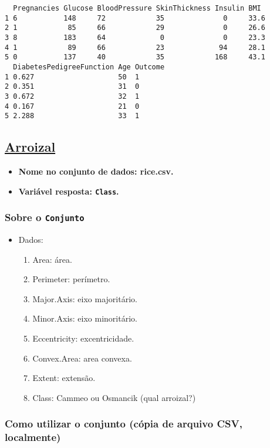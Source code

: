 \documentclass[11pt]{article}
\begin{document}
\begin{verbatim}
  Pregnancies Glucose BloodPressure SkinThickness Insulin BMI 
1 6           148     72            35              0     33.6
2 1            85     66            29              0     26.6
3 8           183     64             0              0     23.3
4 1            89     66            23             94     28.1
5 0           137     40            35            168     43.1
  DiabetesPedigreeFunction Age Outcome
1 0.627                    50  1      
2 0.351                    31  0      
3 0.672                    32  1      
4 0.167                    21  0      
5 2.288                    33  1      
\end{verbatim}
\clearpage

\subsection{\href{https://archive.ics.uci.edu/ml/datasets/Rice+\%28Cammeo+and+Osmancik\%29}{Arroizal}}
\label{sec:orga37d264}
\begin{itemize}
\item \textbf{Nome no conjunto de dados: \textbf{rice.csv}.}
\item \textbf{Variável resposta:  \texttt{Class}.}
\end{itemize}
\subsubsection{Sobre o \texttt{Conjunto}}
\label{sec:org9af66ca}
\begin{itemize}
\item Dados:
\begin{enumerate}
\item Area: área.
\item Perimeter: perímetro.
\item Major.Axis: eixo majoritário.
\item Minor.Axis: eixo minoritário.
\item Eccentricity: excentricidade.
\item Convex.Area: area convexa.
\item Extent: extensão.
\item Class: Cammeo ou Osmancik (qual arroizal?)
\end{enumerate}
\end{itemize}
\subsubsection{Como utilizar o conjunto (cópia de arquivo CSV, localmente)}
\label{sec:org848453f}
\end{document}
